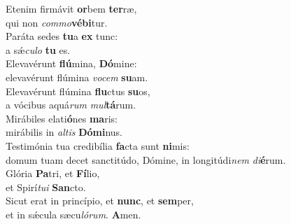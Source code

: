 \evenverse Etenim firmávit \textbf{or}bem \textbf{ter}ræ,~\*\\
\evenverse qui non \textit{com}\textit{mo}\textbf{vé}\textbf{bi}tur.\\
\oddverse Paráta sedes \textbf{tu}a \textbf{ex} tunc:~\*\\
\oddverse a sǽ\textit{cu}\textit{lo} \textbf{tu} es.\\
\evenverse Elevavérunt \textbf{flú}mina, \textbf{Dó}mine:~\*\\
\evenverse elevavérunt flúmina \textit{vo}\textit{cem} \textbf{su}am.\\
\oddverse Elevavérunt flúmina \textbf{flu}ctus \textbf{su}os,~\*\\
\oddverse a vócibus aquá\textit{rum} \textit{mul}\textbf{tá}rum.\\
\evenverse Mirábiles elati\textbf{ó}nes \textbf{ma}ris:~\*\\
\evenverse mirábilis in \textit{al}\textit{tis} \textbf{Dó}\textbf{mi}nus.\\
\oddverse Testimónia tua credibília \textbf{fa}cta sunt \textbf{ni}mis:~\*\\
\oddverse domum tuam decet sanctitúdo, Dómine, in longitúdi\textit{nem} \textit{di}\textbf{é}rum.\\
\evenverse Glória \textbf{Pa}tri, et \textbf{Fí}lio,~\*\\
\evenverse et Spirí\textit{tu}\textit{i} \textbf{San}cto.\\
\oddverse Sicut erat in princípio, et \textbf{nunc}, et \textbf{sem}per,~\*\\
\oddverse et in sǽcula sæcu\textit{ló}\textit{rum}. \textbf{A}men.\\
